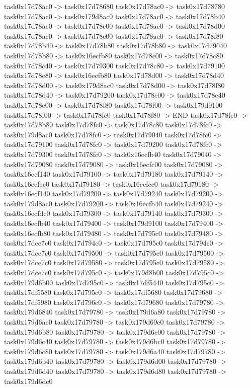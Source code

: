 {	task0x17d78ac0 -> task0x17d78680
	task0x17d78ac0 -> task0x17d78780
	task0x17d78ac0 -> task0x179d8ac0
	task0x17d78ac0 -> task0x17d78b40
	task0x17d78ac0 -> task0x17d78c00
	task0x17d78ac0 -> task0x17d78d00
	task0x17d78ac0 -> task0x17d78e00
	task0x17d78ac0 -> task0x17d78f80
	task0x17d78b40 -> task0x17d78b80
	task0x17d78b80 -> task0x17d79040
	task0x17d78b80 -> task0x16ecfb80
	task0x17d78c00 -> task0x17d78c80
	task0x17d78c40 -> task0x17d79300
	task0x17d78c80 -> task0x17d79100
	task0x17d78c80 -> task0x16ecfb80
	task0x17d78d00 -> task0x17d78d40
	task0x17d78d00 -> task0x179d8ac0
	task0x17d78d00 -> task0x17d78f80
	task0x17d78d40 -> task0x17d79200
	task0x17d78e00 -> task0x17d78c40
	task0x17d78e00 -> task0x17d78f80
	task0x17d78f00 -> task0x179d9100
	task0x17d78f00 -> task0x17d78fc0
	task0x17d78f80 -> END
	task0x17d78fc0 -> task0x17d78b80
	task0x17d78fc0 -> task0x17d78c80
	task0x17d78fc0 -> task0x179d8ac0
	task0x17d78fc0 -> task0x17d79040
	task0x17d78fc0 -> task0x17d79100
	task0x17d78fc0 -> task0x17d79200
	task0x17d78fc0 -> task0x17d79300
	task0x17d78fc0 -> task0x16ecfb40
	task0x17d79040 -> task0x17d79080
	task0x17d79080 -> task0x16ecfc00
	task0x17d79080 -> task0x16ecf140
	task0x17d79100 -> task0x17d79180
	task0x17d79140 -> task0x16ecfec0
	task0x17d79180 -> task0x16ecfcc0
	task0x17d79180 -> task0x16ecf140
	task0x17d79200 -> task0x17d79240
	task0x17d79200 -> task0x179d8ac0
	task0x17d79200 -> task0x16ecfb40
	task0x17d79240 -> task0x16ecfdc0
	task0x17d79300 -> task0x17d79140
	task0x17d79300 -> task0x16ecfb40
	task0x17d79400 -> task0x179d9100
	task0x17d79400 -> task0x16ecfb80
	task0x17d79480 -> task0x17d795c0
	task0x17d79480 -> task0x17dce7c0
	task0x17d794c0 -> task0x17d795c0
	task0x17d794c0 -> task0x17dce7c0
	task0x17d79500 -> task0x17d795c0
	task0x17d79500 -> task0x17dce7c0
	task0x17d79580 -> task0x17d795c0
	task0x17d79580 -> task0x17dce7c0
	task0x17d795c0 -> task0x179d8b00
	task0x17d795c0 -> task0x179d6b00
	task0x17d795c0 -> task0x17df5440
	task0x17d795c0 -> task0x17df5580
	task0x17d795c0 -> task0x17df5680
	task0x17d79680 -> task0x17df5980
	task0x17d796c0 -> task0x17d79680
	task0x17d79780 -> task0x179d6840
	task0x17d79780 -> task0x179d6a80
	task0x17d79780 -> task0x179d6ac0
	task0x17d79780 -> task0x179d69c0
	task0x17d79780 -> task0x179d6b80
	task0x17d79780 -> task0x179d6c00
	task0x17d79780 -> task0x179d6c40
	task0x17d79780 -> task0x179d6bc0
	task0x17d79780 -> task0x179d6c80
	task0x17d79780 -> task0x179d6a40
	task0x17d79780 -> task0x179d6b40
	task0x17d79780 -> task0x179d6d00
	task0x17d79780 -> task0x179d6d40
	task0x17d79780 -> task0x179d6d80
	task0x17d79780 -> task0x179d6dc0
}
